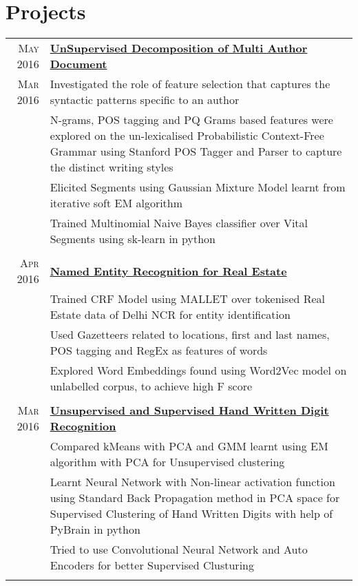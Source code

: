 \documentclass[a4paper,10pt]{article}
\begin{document}
\section{Projects}
\begin{longtable}{r|p{16cm}}

 \textsc{May 2016} & \textbf{\href{https://github.com/kautsiitd/Unsupervised-Decomposition-of-a-Multi-Author-Document}{UnSupervised Decomposition of Multi Author Document}}\\ 
 \textsc{Mar 2016} & Investigated the role of feature selection that captures the syntactic patterns specific to an author\\
& N-grams, POS tagging and PQ Grams based features were explored on the un-lexicalised Probabilistic Context-Free Grammar using Stanford POS Tagger and Parser to capture the distinct writing styles\\
& Elicited Segments using Gaussian Mixture Model learnt from iterative soft EM algorithm\\
& Trained Multinomial Naive Bayes classifier over Vital Segments using sk-learn in python\\\multicolumn{2}{c}{}\\

\textsc{Apr 2016} & \textbf{\href{https://github.com/kautsiitd/NER-for-Real-Estate}{Named Entity Recognition for Real Estate}} \\
& Trained CRF Model using MALLET over tokenised Real Estate data of Delhi NCR for entity identification\\
& Used Gazetteers related to locations, first and last names, POS tagging and RegEx as features of words\\
& Explored Word Embeddings found using Word2Vec model on unlabelled corpus, to achieve high F score\\\multicolumn{2}{c}{}\\

\textsc{Mar 2016} & \textbf{\href{https://github.com/kautsiitd/Unsupervised-Hand-Written-Digit-Recognition}{Unsupervised and Supervised Hand Written Digit Recognition}} \\
& Compared kMeans with PCA and GMM learnt using EM algorithm with PCA for Unsupervised clustering\\
& Learnt Neural Network with Non-linear activation function using Standard Back Propagation method in PCA space for Supervised Clustering of Hand Written Digits with help of PyBrain in python
\\
& Tried to use Convolutional Neural Network and Auto Encoders for better Supervised Clusturing\\\multicolumn{2}{c}{}\\


\end{longtable}
\end{document}
